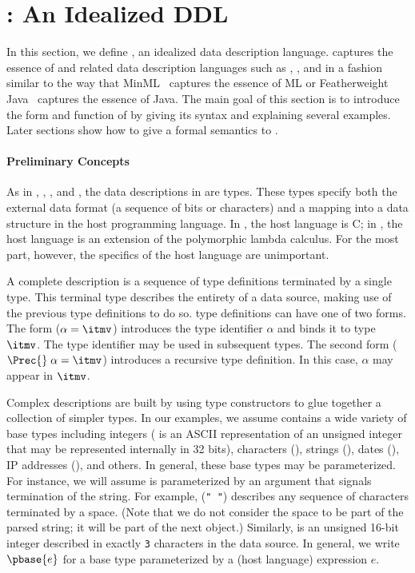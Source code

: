 \section{\ipads{}:  An Idealized DDL}
\label{sec:ipads}

In this section, we define \ipads{}, an idealized data description
language.  \ipads{} captures the essence of \padsc{} and related data
description languages such as \padsml{}, \packettypes{}, and
\datascript{} in a fashion similar to the way that
MinML~\cite{harper:plbook} captures the essence of ML or Featherweight
Java~\cite{igarasi+:featherweight} captures the essence of Java.  The
main goal of this section is to introduce the form and function of
\ipads{} by giving its syntax and explaining several examples.  Later
sections show how to give a formal semantics to \ipads{}.

\paragraph*{Preliminary Concepts}
As in \padsc{}, \padsml{}, 
\packettypes{}, and \datascript{}, the  data
descriptions in \ipads{} are types.  These types specify both the external data
format (a sequence of bits or characters) and a mapping into a
data structure in the host programming language.  In \padsc{},
the host language is C; in \ipads, the host language is an extension
of the polymorphic lambda calculus.  For the most part, however, the
specifics of the host language are unimportant.

A complete \ipads{} description is a sequence of type definitions
terminated by a single type.  This terminal type describes the
entirety of a data source, making use of the previous 
type definitions to do so.  \ipads{} type definitions can have one of
two forms.  The form ($\alpha = \itmv$) introduces the type identifier
$\alpha$ and binds it to \ipads{} type $\itmv$.
The type identifier may be used in
subsequent types.  The second form  ($\Prec{}\; \alpha = \itmv$) introduces
a recursive type definition.  In this case, $\alpha$ may appear in 
$\itmv$.

Complex \ipads{} descriptions are built by using type constructors to glue together a collection of simpler types. In our examples, we
assume \ipads{} contains a wide variety of base types including
integers (\Puint{} is an ASCII representation of an unsigned
integer that may be represented internally in 32 bits), 
characters (\Pchar), strings (\Pstring), dates
(\Pdate), IP addresses (\Pip), and others.  In general, these base
types may be parameterized.  For instance, we will assume \Pstring{} is
parameterized by an argument that signals termination of the
string.  For example, \Pstring({\tt " "}) describes any sequence of
characters terminated by a space. 
(Note that we do not consider the space to be part of the parsed string; 
it will be part of the next object.)
Similarly,  is an unsigned 16-bit
integer described in exactly {\tt 3} characters in the data source.
In general, we write $\pbase{e}$ for a base type parameterized by a
(host language) expression $e$.


